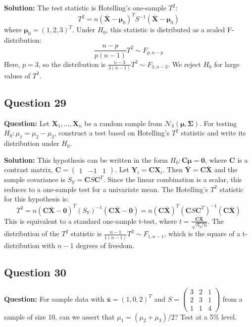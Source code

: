 \textbf{Solution:}
The test statistic is Hotelling's one-sample $T^2$:
$$ T^2 = n(\bar{\mathbf{X}} - \boldsymbol{\mu}_0)^T S^{-1} (\bar{\mathbf{X}} - \boldsymbol{\mu}_0) $$
where $\boldsymbol{\mu}_0 = (1,2,3)^T$.
Under $H_0$, this statistic is distributed as a scaled F-distribution:
$$ \frac{n-p}{p(n-1)} T^2 \sim F_{p, n-p} $$
Here, $p=3$, so the distribution is $\frac{n-3}{3(n-1)} T^2 \sim F_{3, n-3}$. We reject $H_0$ for large values of $T^2$.

\subsection*{Question 29}
\textbf{Question:} Let $\mathbf{X}_1, \dots, \mathbf{X}_n$ be a random sample from $\mathcal{N}_3(\boldsymbol{\mu}, \boldsymbol{\Sigma})$. For testing $H_0: \mu_1 = \mu_2 - \mu_3$, construct a test based on Hotelling's $T^2$ statistic and write its distribution under $H_0$.

\textbf{Solution:}
This hypothesis can be written in the form $H_0: \mathbf{C}\boldsymbol{\mu} = \mathbf{0}$, where $\mathbf{C}$ is a contrast matrix, $\mathbf{C} = \begin{pmatrix} 1 & -1 & 1 \end{pmatrix}$.
Let $\mathbf{Y}_i = \mathbf{C}\mathbf{X}_i$. Then $\bar{\mathbf{Y}} = \mathbf{C}\bar{\mathbf{X}}$ and the sample covariance is $S_Y = \mathbf{C}S\mathbf{C}^T$.
Since the linear combination is a scalar, this reduces to a one-sample test for a univariate mean. The Hotelling's $T^2$ statistic for this hypothesis is:
$$ T^2 = n(\mathbf{C}\bar{\mathbf{X}} - \mathbf{0})^T (S_Y)^{-1} (\mathbf{C}\bar{\mathbf{X}} - \mathbf{0}) = n(\mathbf{C}\bar{\mathbf{X}})^T (\mathbf{C}S\mathbf{C}^T)^{-1} (\mathbf{C}\bar{\mathbf{X}}) $$
This is equivalent to a standard one-sample t-test, where $t = \frac{\mathbf{C}\bar{\mathbf{X}}}{\sqrt{S_Y/n}}$. The distribution of the $T^2$ statistic is $\frac{n-1}{1(n-1)}T^2 \sim F_{1, n-1}$, which is the square of a t-distribution with $n-1$ degrees of freedom.

\subsection*{Question 30}
\textbf{Question:} For sample data with $\bar{\mathbf{x}} = (1,0,2)^T$ and $S = \begin{pmatrix} 3 & 2 & 1 \\ 2 & 3 & 1 \\ 1 & 1 & 4 \end{pmatrix}$ from a sample of size 10, can we assert that $\mu_1 = (\mu_2+\mu_3)/2$? Test at a 5\% level.

